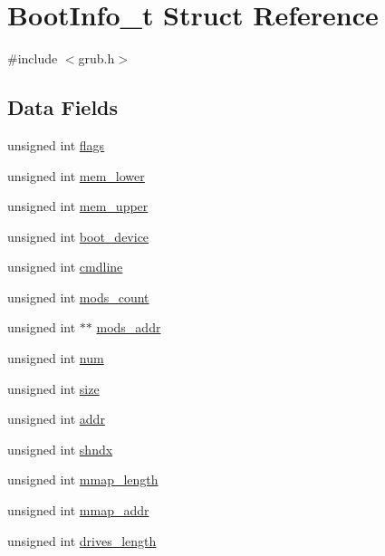 \hypertarget{structBootInfo__t}{\section{Boot\+Info\+\_\+t Struct Reference}
\label{structBootInfo__t}
}


{\ttfamily \#include $<$grub.\+h$>$}

\subsection*{Data Fields}
\begin{DoxyCompactItemize}
\item 
unsigned int \hyperlink{structBootInfo__t_a255b75459b2ed645abe749075f3ca25d}{flags}
\item 
unsigned int \hyperlink{structBootInfo__t_a4b144c9db5fe2c5a9d72522068d65138}{mem\+\_\+lower}
\item 
unsigned int \hyperlink{structBootInfo__t_ab20281f521d626a49714e06b62291be9}{mem\+\_\+upper}
\item 
unsigned int \hyperlink{structBootInfo__t_a11fa989df3074f1a90fcb646aa434b97}{boot\+\_\+device}
\item 
unsigned int \hyperlink{structBootInfo__t_a23d97e399056fd818fdd31ceb1a07f42}{cmdline}
\item 
unsigned int \hyperlink{structBootInfo__t_a178ef95a8fbd89ec018899b9ba241d92}{mods\+\_\+count}
\item 
unsigned int $\ast$$\ast$ \hyperlink{structBootInfo__t_a1be510e25cd3a21bfd0d4d3b303e0543}{mods\+\_\+addr}
\item 
unsigned int \hyperlink{structBootInfo__t_a6a38dc50fe6f5719f544488a265b8cf1}{num}
\item 
unsigned int \hyperlink{structBootInfo__t_a761344d9a2bf10e1551dca7bd77f90cf}{size}
\item 
unsigned int \hyperlink{structBootInfo__t_ac0a248c150ec1bceaafc488988174a1d}{addr}
\item 
unsigned int \hyperlink{structBootInfo__t_ab2c8b3b8778032a87c0c2fe73245e9e8}{shndx}
\item 
unsigned int \hyperlink{structBootInfo__t_ac44eb8289f5f6fbbca78dc24e5052be7}{mmap\+\_\+length}
\item 
unsigned int \hyperlink{structBootInfo__t_a904e8344d4c4ef9a650305409b933b17}{mmap\+\_\+addr}
\item 
unsigned int \hyperlink{structBootInfo__t_adc0745eb234059fc6eb37d8a6c18e4b4}{drives\+\_\+length}
$$
\end{DoxyCompactItemize}
